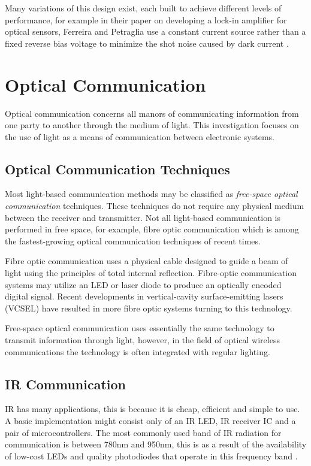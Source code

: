 Many variations of this design exist, each built to achieve different levels of performance, for example in their paper on developing a lock-in amplifier for optical sensors, Ferreira and Petraglia use a constant current source rather than a fixed reverse bias voltage to minimize the shot noise caused by dark current \cite{Ferreira2017}.




\section{Optical Communication}
Optical communication concerns all manors of communicating information from one party to another through the medium of light. This investigation focuses on the use of light as a means of communication between electronic systems.

\subsection{Optical Communication Techniques}

Most light-based communication methods may be classified as \textit{free-space optical communication} techniques. These techniques do not require any physical medium between the receiver and transmitter. Not all light-based communication is performed in free space, for example, fibre optic communication which is among the fastest-growing optical communication techniques of recent times.

Fibre optic communication uses a physical cable designed to guide a beam of light using the principles of total internal reflection. Fibre-optic communication systems may utilize an LED or laser diode to produce an optically encoded digital signal. Recent developments in vertical-cavity surface-emitting lasers (VCSEL) have resulted in more fibre optic systems turning to this technology.

Free-space optical communication uses essentially the same technology to transmit information through light, however, in the field of optical wireless communications the technology is often integrated with regular lighting.

\subsection{IR Communication}

IR has many applications, this is because it is cheap, efficient and simple to use. A basic implementation might consist only of an IR LED, IR receiver IC and a pair of microcontrollers. The most commonly used band of IR radiation for communication is between 780nm and 950nm, this is as a result of the availability of low-cost LEDs and quality photodiodes that operate in this frequency band \cite{Elgala2011}.

